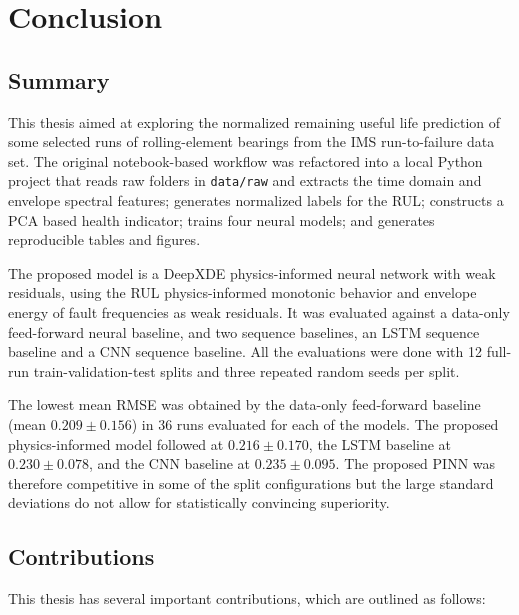 \chapter{Conclusion}
\label{chapter:conclusion}

\section{Summary}

This thesis aimed at exploring the normalized remaining useful life prediction of some selected runs of rolling-element bearings from the IMS run-to-failure data set. The original notebook-based workflow was refactored into a local Python project that reads raw folders in \texttt{data/raw} and extracts the time domain and envelope spectral features; generates normalized labels for the RUL; constructs a PCA based health indicator; trains four neural models; and generates reproducible tables and figures.

The proposed model is a DeepXDE physics-informed neural network with weak residuals, using the RUL physics-informed monotonic behavior and envelope energy of fault frequencies as weak residuals. It was evaluated against a data-only feed-forward neural baseline, and two sequence baselines, an LSTM sequence baseline and a CNN sequence baseline. All the evaluations were done with 12 full-run train-validation-test splits and three repeated random seeds per split.

The lowest mean RMSE was obtained by the data-only feed-forward baseline (mean \(0.209 \pm 0.156\)) in 36 runs evaluated for each of the models. The proposed physics-informed model followed at \(0.216 \pm 0.170\), the LSTM baseline at \(0.230 \pm 0.078\), and the CNN baseline at \(0.235 \pm 0.095\). The proposed PINN was therefore competitive in some of the split configurations but the large standard deviations do not allow for statistically convincing superiority.

\section{Contributions}

This thesis has several important contributions, which are outlined as follows:

